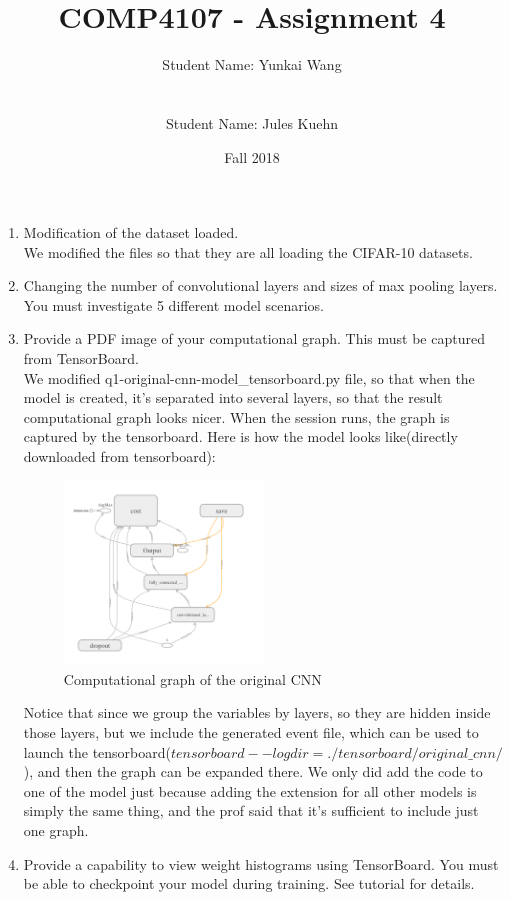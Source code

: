 \documentclass[11pt]{article}
\title{COMP4107 - Assignment 4}
\author{Student Name: Yunkai Wang\\
\text{Student Number: 100968473}\\\\
Student Name: Jules Kuehn\\
\text{Student Number: 100661464}}
\date{Fall 2018}
\begin{document}
\maketitle

\begin{enumerate}
\item Modification of the dataset loaded.\\
We modified the files so that they are all loading the CIFAR-10 datasets.
\item Changing the number of convolutional layers and sizes of max pooling layers. You must investigate 5 different model scenarios.\\
\item Provide a PDF image of your computational graph. This must be captured from TensorBoard.\\
We modified q1-original-cnn-model\_tensorboard.py file, so that when the model is created, it's separated into several layers, so that the result computational graph looks nicer. When the session runs, the graph is captured by the tensorboard. Here is how the model looks like(directly downloaded from tensorboard):
\begin{figure}[h!]
    \centering
     \includegraphics[width=0.5\textwidth]{images/computational_graph}
        \caption{Computational graph of the original CNN}
\end{figure}
Notice that since we group the variables by layers, so they are hidden inside those layers, but we include the generated event file, which can be used to launch the tensorboard($tensorboard --logdir=./tensorboard/original\_cnn/$), and then the graph can be expanded there. We only did add the code to one of the model just because adding the extension for all other models is simply the same thing, and the prof said that it's sufficient to include just one graph.
\item Provide a capability to view weight histograms using TensorBoard. You must be able to checkpoint your model during training. See tutorial for details.\\

\end{enumerate}
\end{document}
